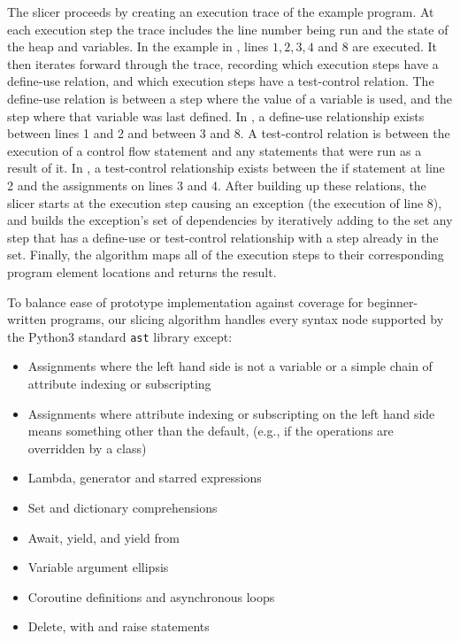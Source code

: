 \documentclass[conference]{IEEEtran}
\newcommand\lt[1]{{\lstinline|#1|}}
\begin{document}
The slicer proceeds by creating an execution trace of the example program.
At each execution step the trace includes the line number being run and the state of the
heap and variables. In the example in ,
lines $1, 2, 3, 4$ and $8$ are executed.
It then iterates forward through the trace, recording which
execution steps have a define-use relation, and which execution steps
have a test-control relation. The define-use relation is between a step where
the value of a variable is used, and the step where that variable was last
defined. In , a define-use relationship exists
between lines 1 and 2 and between 3 and 8. A test-control relation is between
the execution of a control flow statement and any statements that were run as
a result of it. In , a test-control relationship exists
between the if statement at line 2 and the assignments on lines 3 and 4. After
building up these relations, the slicer starts at the execution step causing an
exception (the execution of line 8), and builds the exception's set of
dependencies by iteratively adding to the set any step that has a define-use
or test-control relationship with a step already in the set. Finally, the
algorithm maps all of the execution steps to their corresponding program
element locations and returns the result.

To balance ease of prototype implementation against coverage for
beginner-written programs, our slicing algorithm handles every syntax node
supported by the Python3 standard \lt{ast} library except:
\begin{itemize}
\item Assignments where the left hand side is not a variable or a simple chain
  of attribute indexing or subscripting
\item Assignments where attribute indexing or subscripting on the left hand side
  means something other than the default, (e.g., if the operations are
  overridden by a class)
\item Lambda, generator and starred expressions
\item Set and dictionary comprehensions
\item Await, yield, and yield from
\item Variable argument ellipsis
\item Coroutine definitions and asynchronous loops
\item Delete, with and raise statements
\end{itemize}
\end{document}
